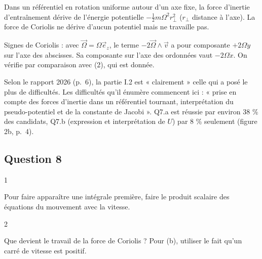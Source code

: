 \documentclass[11pt,a4paper]{article}
\begin{document}
\begin{methode}

Dans un référentiel en rotation uniforme autour d'un axe fixe, la force d'inertie d'entraînement dérive de l'énergie potentielle \(-\frac12m\Omega^2r_\perp^2\) (\(r_\perp\) distance à l'axe). La force de Coriolis ne dérive d'aucun potentiel mais ne travaille pas.

\end{methode}

\begin{piege}

Signes de Coriolis : avec \(\vec\Omega=\Omega\vec e_z\), le terme \(-2\vec\Omega\wedge\vec v\) a pour composante \(+2\Omega\dot y\) sur l'axe des abscisses. Sa composante sur l'axe des ordonnées vaut \(-2\Omega\dot x\). On vérifie par comparaison avec (2), qui est donnée.

\end{piege}

\begin{jury}

Selon le rapport 2026 (p.~6), la partie I.2 est « clairement » celle qui a posé le plus de difficultés. Les difficultés qu'il énumère commencent ici : « prise en compte des forces d'inertie dans un référentiel tournant, interprétation du pseudo-potentiel et de la constante de Jacobi ». Q7.a est réussie par environ 38 \% des candidats, Q7.b (expression et interprétation de \(U\)) par 8 \% seulement (figure 2b, p.~4).

\end{jury}

\hypertarget{question-8}{%
\subsection{Question 8}\label{question-8}}

\begin{indication}{1}

Pour faire apparaître une intégrale première, faire le produit scalaire des équations du mouvement avec la vitesse.

\end{indication}

\begin{indication}{2}

Que devient le travail de la force de Coriolis ? Pour (b), utiliser le fait qu'un carré de vitesse est positif.

\end{indication}
\end{document}
